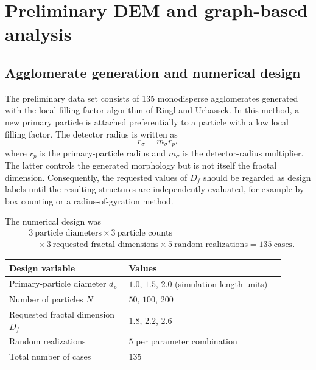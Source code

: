 \section{Preliminary DEM and graph-based analysis}
\label{sec:preliminary_dem_gnn}

\subsection{Agglomerate generation and numerical design}

The preliminary data set consists of 135 monodisperse agglomerates generated
with the local-filling-factor algorithm of Ringl and Urbassek. In this method,
a new primary particle is attached preferentially to a particle with a low
local filling factor. The detector radius is written as
\begin{equation}
    r_{\sigma}=m_{\sigma}r_p,
\end{equation}
where $r_p$ is the primary-particle radius and $m_{\sigma}$ is the detector-radius
multiplier. The latter controls the generated morphology but is not itself the
fractal dimension. Consequently, the requested values of $D_f$ should be
regarded as design labels until the resulting structures are independently
evaluated, for example by box counting or a radius-of-gyration method.

The numerical design was
\begin{equation}
\begin{aligned}
  &3\ \text{particle diameters}\times3\ \text{particle counts}\\
  &\quad\times3\ \text{requested fractal dimensions}
  \times5\ \text{random realizations}=135\ \text{cases}.
\end{aligned}
\end{equation}

\begin{center}
\begin{tabular}{|p{0.39\linewidth}|p{0.51\linewidth}|}
\hline
Design variable & Values \\
\hline
Primary-particle diameter $d_p$ & $1.0$, $1.5$, $2.0$ (simulation length units) \\
Number of particles $N$ & $50$, $100$, $200$ \\
Requested fractal dimension $D_f$ & $1.8$, $2.2$, $2.6$ \\
Random realizations & $5$ per parameter combination \\
Total number of cases & $135$ \\
\hline
\end{tabular}
\end{center}

